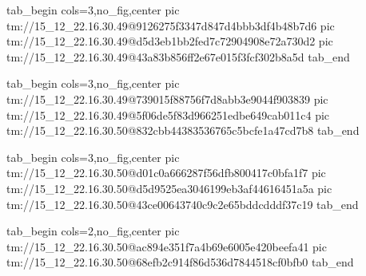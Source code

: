  
 
 
 
 

\qqSecCmtScr


\ifcmt
  tab_begin cols=3,no_fig,center
    pic tm://15_12_22.16.30.49@9126275f3347d847d4bbb3df4b48b7d6
    pic tm://15_12_22.16.30.49@d5d3eb1bb2fed7c72904908e72a730d2
    pic tm://15_12_22.16.30.49@43a83b856ff2e67e015f3fcf302b8a5d
  tab_end
\fi


\ifcmt
  tab_begin cols=3,no_fig,center
    pic tm://15_12_22.16.30.49@739015f88756f7d8abb3e9044f903839
    pic tm://15_12_22.16.30.49@5f06de5f83d966251edbe649cab011c4
    pic tm://15_12_22.16.30.50@832cbb44383536765c5bcfe1a47cd7b8
  tab_end
\fi


\ifcmt
  tab_begin cols=3,no_fig,center
    pic tm://15_12_22.16.30.50@d01c0a666287f56dfb800417c0bfa1f7
    pic tm://15_12_22.16.30.50@d5d9525ea3046199eb3af44616451a5a
    pic tm://15_12_22.16.30.50@43ce00643740c9c2e65bddcdddf37c19
  tab_end
\fi


\ifcmt
  tab_begin cols=2,no_fig,center
    pic tm://15_12_22.16.30.50@ac894e351f7a4b69e6005e420beefa41
    pic tm://15_12_22.16.30.50@68efb2c914f86d536d7844518cf0bfb0
  tab_end
\fi

